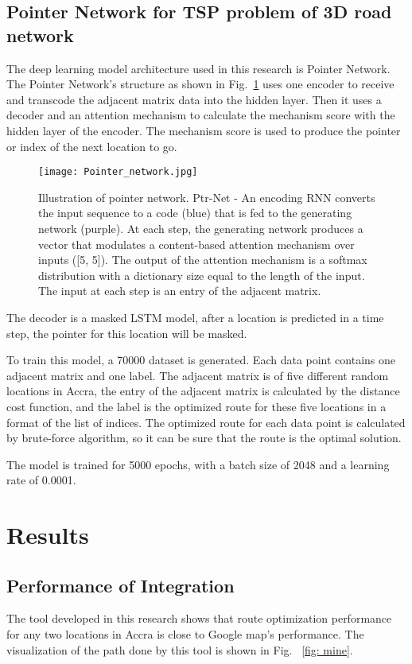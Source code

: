\documentclass[final-report]{report-template}
\begin{document}
\subsection {Pointer Network for TSP problem of 3D road network}
The deep learning model architecture used in this research is Pointer Network\cite{vinyals2017pointer}.
The Pointer Network's structure as shown in Fig.~\ref{fig:pointernet} uses one encoder to receive and transcode the adjacent matrix data into the hidden layer.
Then it uses a decoder and an attention mechanism to calculate the mechanism score with the hidden layer of the encoder.
The mechanism score is used to produce the pointer or index of the next location to go.
\begin{figure}[H]
    \centering
    \texttt{[image: Pointer\_network.jpg]}
    \caption{\label{fig:pointernet}Illustration of pointer network. Ptr-Net - An encoding RNN converts the input sequence to a code (blue) that is fed to the generating network (purple). At each step, the generating network produces a vector that modulates a content-based attention mechanism over inputs ([5, 5]). The output of the attention mechanism is a softmax distribution with a dictionary size equal to the length of the input. The input at each step is an entry of the adjacent matrix.}
\end{figure}
The decoder is a masked LSTM model, after a location is predicted in a time step, the pointer for this location will be masked.

To train this model, a 70000 dataset is generated. Each data point contains one adjacent matrix and one label.
The adjacent matrix is of five different random locations in Accra, the entry of the adjacent matrix is calculated by the distance cost function,
and the label is the optimized route for these five locations in a format of the list of indices.
The optimized route for each data point is calculated by brute-force algorithm, so it can be sure that the route is the optimal solution.

The model is trained for 5000 epochs, with a batch size of 2048 and a learning rate of 0.0001.


\section {Results}
\subsection{Performance of Integration}
The tool developed in this research shows that route optimization performance for any two locations in Accra
is close to Google map's performance.
The visualization of the path done by this tool is shown in Fig. ~\ref{fig: mine}.
\end{document}
